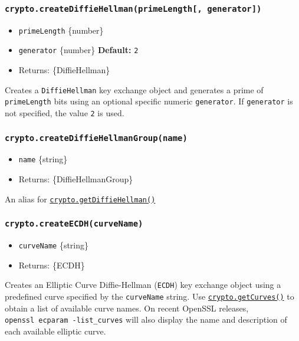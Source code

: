 \subsubsection{\texorpdfstring{\texttt{crypto.createDiffieHellman(primeLength{[},\ generator{]})}}{crypto.createDiffieHellman(primeLength{[}, generator{]})}}\label{crypto.creatediffiehellmanprimelength-generator}

\begin{itemize}
\tightlist
\item
  \texttt{primeLength} \{number\}
\item
  \texttt{generator} \{number\} \textbf{Default:} \texttt{2}
\item
  Returns: \{DiffieHellman\}
\end{itemize}

Creates a \texttt{DiffieHellman} key exchange object and generates a
prime of \texttt{primeLength} bits using an optional specific numeric
\texttt{generator}. If \texttt{generator} is not specified, the value
\texttt{2} is used.

\subsubsection{\texorpdfstring{\texttt{crypto.createDiffieHellmanGroup(name)}}{crypto.createDiffieHellmanGroup(name)}}\label{crypto.creatediffiehellmangroupname}

\begin{itemize}
\tightlist
\item
  \texttt{name} \{string\}
\item
  Returns: \{DiffieHellmanGroup\}
\end{itemize}

An alias for
\hyperref[cryptogetdiffiehellmangroupname]{\texttt{crypto.getDiffieHellman()}}

\subsubsection{\texorpdfstring{\texttt{crypto.createECDH(curveName)}}{crypto.createECDH(curveName)}}\label{crypto.createecdhcurvename}

\begin{itemize}
\tightlist
\item
  \texttt{curveName} \{string\}
\item
  Returns: \{ECDH\}
\end{itemize}

Creates an Elliptic Curve Diffie-Hellman (\texttt{ECDH}) key exchange
object using a predefined curve specified by the \texttt{curveName}
string. Use \hyperref[cryptogetcurves]{\texttt{crypto.getCurves()}} to
obtain a list of available curve names. On recent OpenSSL releases,
\texttt{openssl\ ecparam\ -list\_curves} will also display the name and
description of each available elliptic curve.

